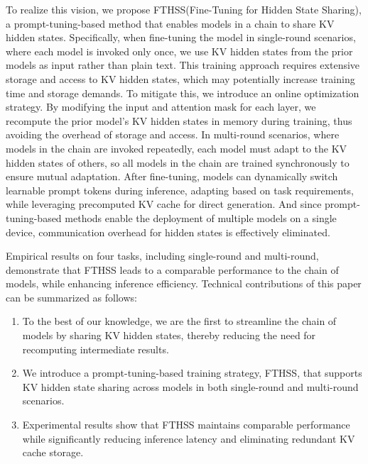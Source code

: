 To realize this vision, we propose FTHSS(Fine-Tuning for Hidden State Sharing), a prompt-tuning-based method that enables models in a chain to share KV hidden states. Specifically, when fine-tuning the model in single-round scenarios, where each model is invoked only once, we use KV hidden states from the prior models as input rather than plain text. This training approach requires extensive storage and access to KV hidden states, which may potentially increase training time and storage demands. To mitigate this, we introduce an online optimization strategy. By modifying the input and attention mask for each layer, we recompute the prior model's KV hidden states in memory during training, thus avoiding the overhead of storage and access. In multi-round scenarios, where models in the chain are invoked repeatedly, each model must adapt to the KV hidden states of others, so all models in the chain are trained synchronously to ensure mutual adaptation. 
After fine-tuning, models can dynamically switch learnable prompt tokens during inference, adapting based on task requirements, while leveraging precomputed KV cache for direct generation. And since prompt-tuning-based methods enable the deployment of multiple models on a single device, communication overhead for hidden states is effectively eliminated.


Empirical results on four tasks, including single-round and multi-round, demonstrate that FTHSS leads to a comparable performance to the chain of models, 
while enhancing inference efficiency.
Technical contributions of this paper can be summarized as follows:
\begin{enumerate}
\item[\textbullet]To the best of our knowledge, we are the first to streamline the chain of models by sharing KV hidden states, thereby reducing the need for recomputing intermediate results.

\item[\textbullet]We introduce a prompt-tuning-based training strategy, FTHSS, that supports KV hidden state sharing across models in both single-round and multi-round scenarios.

\item[\textbullet] Experimental results show that FTHSS maintains comparable performance while significantly reducing inference latency and eliminating redundant KV cache storage.
\end{enumerate}